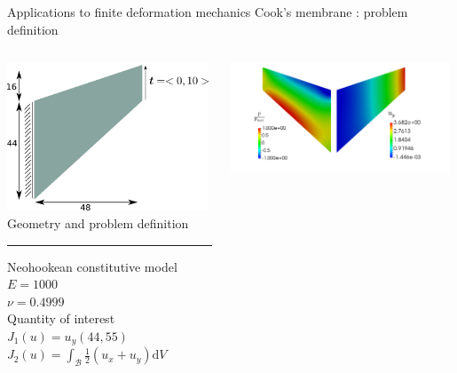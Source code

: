 \documentclass[fleqn]{beamer}
\begin{document}
\begin{frame}{Applications to finite deformation mechanics}
{Cook's membrane : problem definition}
\scriptsize
\begin{columns}
\begin{column}{0.4\textwidth}
\includegraphics[width=0.98\textwidth]{../img/mech_cooks_geom}
\vspace{1em}
Geometry and problem definition \\
\vspace{1em}
\hrule
\vspace{1em}
Neohookean constitutive model \\
$E = 1000$ \\
$\nu = 0.4999$ \\
\vspace{1em}
Quantity of interest \\ [8pt]
$J_1(u) = u_y(44, 55)$ \\
$J_2(u) = \int_{\mathcal{B}} \frac12 (u_x + u_y) \text{d} V$
\end{column}
\begin{column}{0.6\textwidth}%
\includegraphics[width=0.98\textwidth]{../img/defend_cooks_reference}

\end{column}
\end{columns}
\end{frame}
\end{document}
